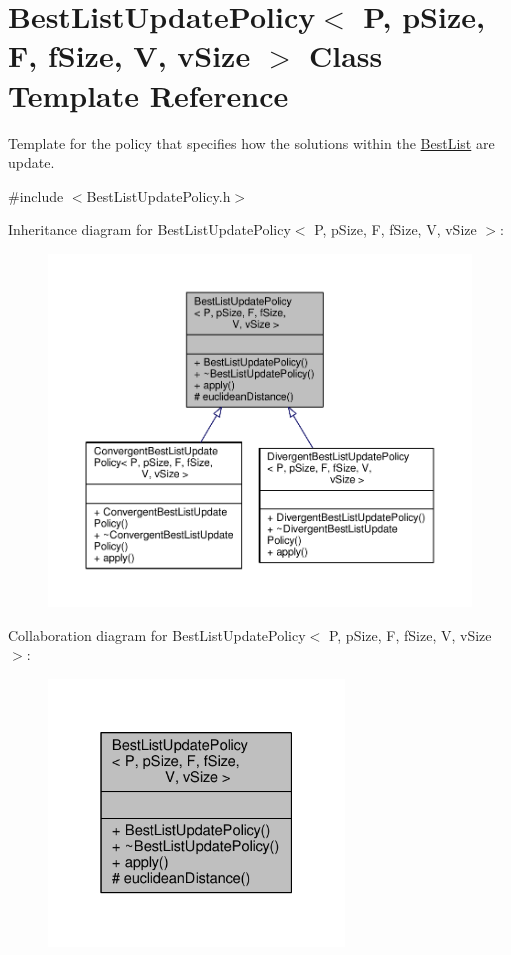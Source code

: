 \hypertarget{classBestListUpdatePolicy}{}\section{Best\+List\+Update\+Policy$<$ P, p\+Size, F, f\+Size, V, v\+Size $>$ Class Template Reference}
\label{classBestListUpdatePolicy}


Template for the policy that specifies how the solutions within the \hyperlink{classBestList}{Best\+List} are update.  




{\ttfamily \#include $<$Best\+List\+Update\+Policy.\+h$>$}



Inheritance diagram for Best\+List\+Update\+Policy$<$ P, p\+Size, F, f\+Size, V, v\+Size $>$\+:
\nopagebreak
\begin{figure}[H]
\begin{center}
\leavevmode
\includegraphics[width=350pt]{classBestListUpdatePolicy__inherit__graph}
\end{center}
\end{figure}


Collaboration diagram for Best\+List\+Update\+Policy$<$ P, p\+Size, F, f\+Size, V, v\+Size $>$\+:
\nopagebreak
\begin{figure}[H]
\begin{center}
\leavevmode
\includegraphics[width=223pt]{classBestListUpdatePolicy__coll__graph}
\end{center}
\end{figure}
